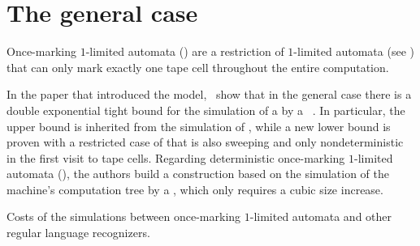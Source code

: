 \section{The general case}\label{sec:oncemarking-general}
Once-marking $1$-limited automata (\OMOLAs) are a restriction of $1$-limited automata (see ) that can only mark exactly one tape cell throughout the entire computation.

In the paper that introduced the model,~\citeauthor{PigPri23a} show that in the general case there is a double exponential tight bound for the simulation of a \OMOLA by a \ODFA~\cite{PigPri23a}.
In particular, the upper bound is inherited from the simulation of \OLAs, while a new lower bound is proven with a restricted case of \OMOLA that is also sweeping and only nondeterministic in the first visit to tape cells.
Regarding deterministic once-marking $1$-limited automata (\OMODLAs), the authors build a construction based on the simulation of the machine's computation tree by a \TDFA, which only requires a cubic size increase.

\begin{table}
	\centering
	\caption{Costs of the simulations between once-marking $1$-limited automata and other regular language recognizers.}
	\label{tab:sims-om-general-oncemarking}
\end{table}

